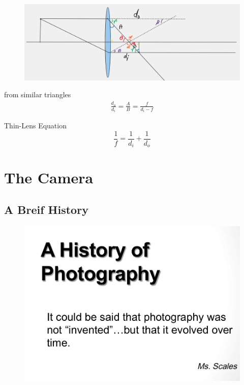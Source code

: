\documentclass{beamer}
\begin{document}
\begin{frame}
	\begin{figure}
		\centering
		\includegraphics[scale=0.1]{60.png}
	\end{figure}
	from similar triangles
	\begin{align*}
		\frac{d_{o}}{d_{i}} = \frac{A}{B} = \frac{f}{d_{i} - f} 
	\end{align*}
	\begin{block}{Thin-Lens Equation}
		\begin{displaymath}
			\frac{1}{f} = \frac{1}{d_{i}} + \frac{1}{d_{o}}
		\end{displaymath}
		
	\end{block}
\end{frame}



\section{The Camera}
\subsection{A Breif History}
\begin{frame}
	\begin{figure}
		\centering
		\includegraphics[scale=0.4]{63.jpg}
	\end{figure}
\end{frame}
\end{document}
